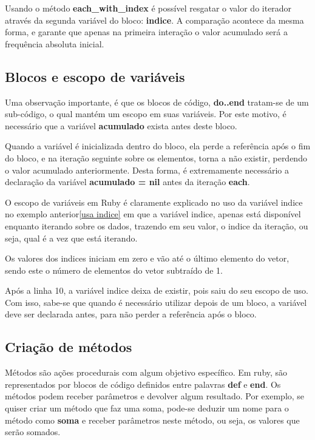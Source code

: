 \documentclass[espaco=simples,appendix=Name]{abnt}
\newcommand{\code}[1] {\textbf{#1}}
\begin{document}
Usando o método \code{each\_with\_index} é possível resgatar o valor do iterador através da segunda variável do bloco: \code{indice}. A comparação acontece da mesma forma, e garante que apenas na primeira interação o valor acumulado será a frequência absoluta inicial.

\subsection{Blocos e escopo de variáveis}

Uma observação importante, é que os blocos de código, \code{do..end} tratam-se de um sub-código, o qual mantém um escopo em suas variáveis. Por este motivo, é necessário que a variável \code{acumulado} exista antes deste bloco. 

Quando a variável é inicializada dentro do bloco, ela perde a referência após o fim do bloco, e na iteração seguinte sobre os elementos, torna a não existir, perdendo o valor acumulado anteriormente. Desta forma, é extremamente necessário a declaração da variável \code{acumulado = nil} antes da iteração \code{each}.

O escopo de variáveis em Ruby é claramente explicado no uso da variável indice no exemplo anterior\ref{usa indice} em que a variável indice, apenas está disponível enquanto iterando sobre os dados, trazendo em seu valor, o indice da iteração, ou seja, qual é a vez que está iterando.

Os valores dos indices iniciam em zero e vão até o último elemento do vetor, sendo este o número de elementos do vetor subtraído de 1.

Após a linha 10, a variável indice deixa de existir, pois saiu do seu escopo de uso. Com isso, sabe-se que quando é necessário utilizar depois de um bloco, a variável deve ser declarada antes, para não perder a referência após o bloco.



\subsection{Criação de métodos}

Métodos são ações procedurais com algum objetivo específico. Em ruby, são representados por blocos de código definidos entre palavras \code{def} e \code{end}. Os métodos podem receber parâmetros e devolver algum resultado. Por exemplo, se quiser criar um método que faz uma soma, pode-se deduzir um nome para o método como \code{soma} e receber parâmetros neste método, ou seja, os valores que serão somados.
\end{document}
